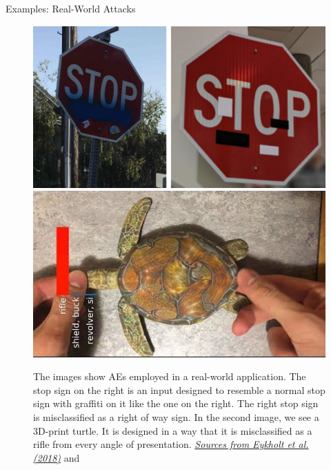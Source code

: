 \documentclass[11pt,compress,t,notes=noshow, xcolor=table]{beamer}
\begin{document}
\begin{vbframe}{Examples: Real-World Attacks}
\begin{figure}[h]
\centering
\includegraphics[width=0.46\linewidth]{figure/AEstop.png}\quad \includegraphics[width=0.45\linewidth]{figure/AEturtle.jpg}
  \caption{The images show AEs employed in a real-world application. The stop sign on the right is an input designed to resemble a normal stop sign with graffiti on it like the one on the right. The right stop sign is misclassified as a right of way sign. In the second image, we see a 3D-print turtle. It is designed in a way that it is misclassified as a rifle from every angle of presentation. \href{https://arxiv.org/abs/1807.07769}{\textit{Sources from Eykholt et al. (2018)}} and \href{https://arxiv.org/pdf/1707.07397.pdf}{}}
  \label{fig:mnist}
\end{figure} 


\end{vbframe}
\end{document}
